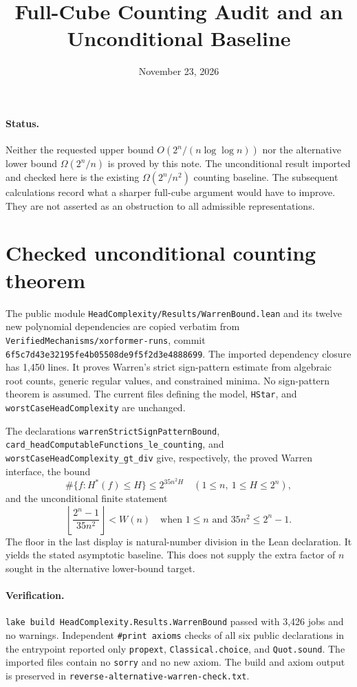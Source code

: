 \documentclass[11pt]{article}
\title{Full-Cube Counting Audit and an Unconditional Baseline}
\author{}
\date{November 23, 2026}
\begin{document}
\maketitle

\paragraph{Status.}
Neither the requested upper bound $O(2^n/(n\log\log n))$ nor the
alternative lower bound $\Omega(2^n/n)$ is proved by this note.
The unconditional result imported and checked here is the existing
$\Omega(2^n/n^2)$ counting baseline. The subsequent calculations record
what a sharper full-cube argument would have to improve. They are not
asserted as an obstruction to all admissible representations.

\section{Checked unconditional counting theorem}
The public module
\texttt{HeadComplexity/Results/WarrenBound.lean} and its twelve new
polynomial dependencies are copied verbatim from
\texttt{VerifiedMechanisms/xorformer-runs}, commit
\texttt{6f5c7d43e32195fe4b05508de9f5f2d3e4888699}.
The imported dependency closure has 1,450 lines. It proves Warren's
strict sign-pattern estimate from algebraic root counts, generic regular
values, and constrained minima. No sign-pattern theorem is assumed.
The current files defining the model, \texttt{HStar}, and
\texttt{worstCaseHeadComplexity} are unchanged.

The declarations
\texttt{warrenStrictSignPatternBound},
\texttt{card\_headComputableFunctions\_le\_counting}, and
\texttt{worstCaseHeadComplexity\_gt\_div}
give, respectively, the proved Warren interface, the bound
\[
 \#\{f:H^*(f)\leq H\}\leq2^{35n^2H}
 \quad(1\leq n,\ 1\leq H\leq2^n),
\]
and the unconditional finite statement
\[
 \left\lfloor\frac{2^n-1}{35n^2}\right\rfloor<W(n)
 \quad\text{when }1\leq n\text{ and }35n^2\leq2^n-1.
\]
The floor in the last display is natural-number division in the Lean
declaration. It yields the stated asymptotic baseline.
This does not supply the extra factor of $n$ sought in the
alternative lower-bound target.

\paragraph{Verification.}
\texttt{lake build HeadComplexity.Results.WarrenBound} passed with
3,426 jobs and no warnings. Independent \texttt{\#print axioms} checks of
all six public declarations in the entrypoint reported only
\texttt{propext}, \texttt{Classical.choice}, and \texttt{Quot.sound}.
The imported files contain no \texttt{sorry} and no new axiom.
The build and axiom output is preserved in
\texttt{reverse-alternative-warren-check.txt}.
\end{document}
